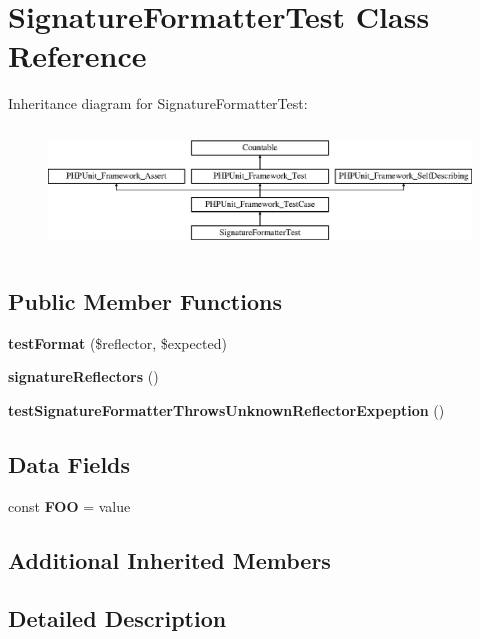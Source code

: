 \section{Signature\+Formatter\+Test Class Reference}
\label{class_psy_1_1_test_1_1_formatter_1_1_signature_formatter_test}
Inheritance diagram for Signature\+Formatter\+Test\+:\begin{figure}[H]
\begin{center}
\leavevmode
\includegraphics[height=3.303835cm]{class_psy_1_1_test_1_1_formatter_1_1_signature_formatter_test}
\end{center}
\end{figure}
\subsection*{Public Member Functions}
\begin{DoxyCompactItemize}
\item 
{\bf test\+Format} (\$reflector, \$expected)
\item 
{\bf signature\+Reflectors} ()
\item 
{\bf test\+Signature\+Formatter\+Throws\+Unknown\+Reflector\+Expeption} ()
\end{DoxyCompactItemize}
\subsection*{Data Fields}
\begin{DoxyCompactItemize}
\item 
const {\bf F\+O\+O} =  value\textquotesingle{}
\end{DoxyCompactItemize}
\subsection*{Additional Inherited Members}


\subsection{Detailed Description}



